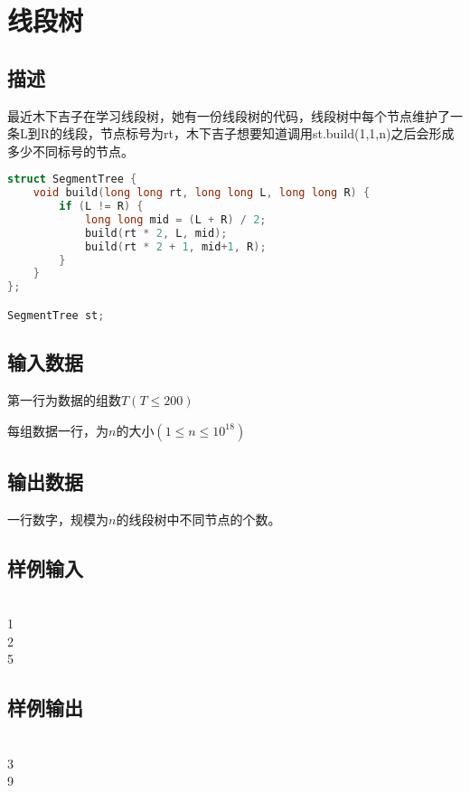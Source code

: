 \ifx\allfiles\undefined

\fi


\section{线段树}
\subsection*{描述}
最近木下吉子在学习线段树，她有一份线段树的代码，线段树中每个节点维护了一条L到R的线段，节点标号为rt，木下吉子想要知道调用st.build(1,1,n)之后会形成多少不同标号的节点。
\begin{lstlisting}[language=C++]
struct SegmentTree {
	void build(long long rt, long long L, long long R) {
		if (L != R) {
			long long mid = (L + R) / 2;
			build(rt * 2, L, mid);
			build(rt * 2 + 1, mid+1, R);
		}
	}
};

SegmentTree st;
\end{lstlisting} 

\subsection*{输入数据}
第一行为数据的组数$T(T\leqslant 200)$

每组数据一行，为$n$的大小$(1\leqslant n\leqslant 10^{18})$

\subsection*{输出数据}
一行数字，规模为$n$的线段树中不同节点的个数。


\subsection*{样例输入}
\\
1\\
2\\
5


\subsection*{样例输出}
\\
3\\
9


\ifx\allfiles\undefined

\fi